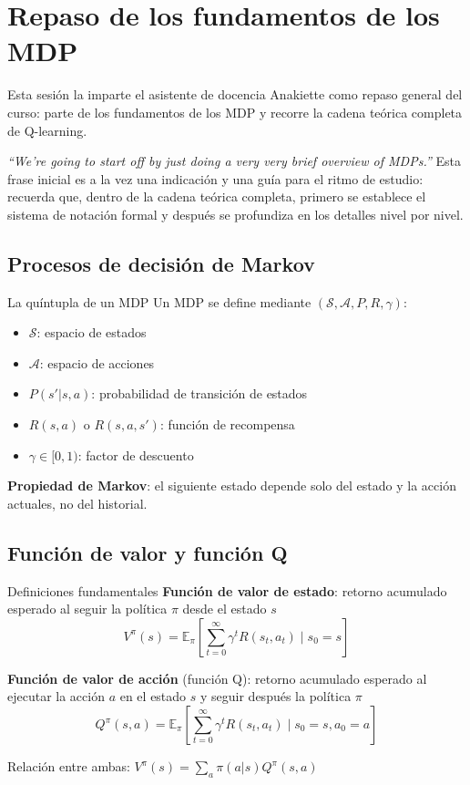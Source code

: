 \section{Repaso de los fundamentos de los MDP}

Esta sesión la imparte el asistente de docencia Anakiette como repaso general del curso: parte de los fundamentos de los MDP y recorre la cadena teórica completa de Q-learning.

\textit{``We're going to start off by just doing a very very brief overview of MDPs.''} Esta frase inicial es a la vez una indicación y una guía para el ritmo de estudio: recuerda que, dentro de la cadena teórica completa, primero se establece el sistema de notación formal y después se profundiza en los detalles nivel por nivel.

\subsection{Procesos de decisión de Markov}

\begin{importantbox}{La quíntupla de un MDP}
Un MDP se define mediante $(\mathcal{S}, \mathcal{A}, P, R, \gamma)$:
\begin{itemize}
    \item $\mathcal{S}$: espacio de estados
    \item $\mathcal{A}$: espacio de acciones
    \item $P(s' | s, a)$: probabilidad de transición de estados
    \item $R(s, a)$ o $R(s, a, s')$: función de recompensa
    \item $\gamma \in [0, 1)$: factor de descuento
\end{itemize}
\textbf{Propiedad de Markov}: el siguiente estado depende solo del estado y la acción actuales, no del historial.
\end{importantbox}

\subsection{Función de valor y función Q}

\begin{importantbox}{Definiciones fundamentales}
\textbf{Función de valor de estado}: retorno acumulado esperado al seguir la política $\pi$ desde el estado $s$
$$V^\pi(s) = \mathbb{E}_\pi\left[\sum_{t=0}^{\infty} \gamma^t R(s_t, a_t) \mid s_0 = s\right]$$

\textbf{Función de valor de acción} (función Q): retorno acumulado esperado al ejecutar la acción $a$ en el estado $s$ y seguir después la política $\pi$
$$Q^\pi(s, a) = \mathbb{E}_\pi\left[\sum_{t=0}^{\infty} \gamma^t R(s_t, a_t) \mid s_0 = s, a_0 = a\right]$$

Relación entre ambas: $V^\pi(s) = \sum_a \pi(a|s) Q^\pi(s, a)$
\end{importantbox}

